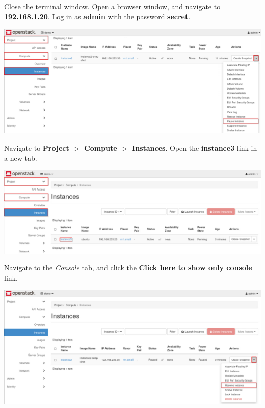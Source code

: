 \documentclass[letterpaper, 12pt]{article}
\begin{document}
\begin{enumerate}
    \begin{labstep}
        Close the terminal window.
        Open a browser window, and navigate to \textbf{192.168.1.20}.
        Log in as \textbf{admin} with the password \textbf{secret}.

        \begin{center}
            \includegraphics[scale=0.5]{images/part3/step3.png}
        \end{center}
    \end{labstep}

    \begin{labstep}
        Navigate to \textbf{Project $>$ Compute $>$ Instances}.
        Open the \textbf{instance3} link in a new tab.

        \begin{center}
            \includegraphics[width=\linewidth]{images/part3/step4.png}
        \end{center}
    \end{labstep}

    \begin{labstep}
        Navigate to the \textit{Console} tab, and click the \textbf{Click here to show only console} link.

        \begin{center}
            \includegraphics[width=\linewidth]{images/part3/step5.png}
        \end{center}
    \end{labstep}


\end{enumerate}
\end{document}
